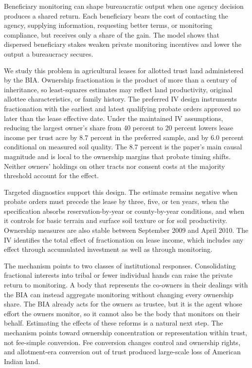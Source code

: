 \documentclass[12pt]{article}
\begin{document}
Beneficiary monitoring can shape bureaucratic output when one agency decision produces a shared return. Each beneficiary bears the cost of contacting the agency, supplying information, requesting better terms, or monitoring compliance, but receives only a share of the gain. The model shows that dispersed beneficiary stakes weaken private monitoring incentives and lower the output a bureaucracy secures.

We study this problem in agricultural leases for allotted trust land administered by the BIA. Ownership fractionation is the product of more than a century of inheritance, so least-squares estimates may reflect land productivity, original allottee characteristics, or family history. The preferred IV design instruments fractionation with the earliest and latest qualifying probate orders approved no later than the lease effective date. Under the maintained IV assumptions, reducing the largest owner's share from 40 percent to 20 percent lowers lease income per trust acre by 8.7 percent in the preferred sample, and by 6.0 percent conditional on measured soil quality. The 8.7 percent is the paper's main causal magnitude and is local to the ownership margins that probate timing shifts. Neither owners' holdings on other tracts nor consent costs at the majority threshold account for the effect.

Targeted diagnostics support this design. The estimate remains negative when probate orders must precede the lease by three, five, or ten years, when the specification absorbs reservation-by-year or county-by-year conditions, and when it controls for basic terrain and surface soil texture or for soil productivity. Ownership measures are also stable between September 2009 and April 2010. The IV identifies the total effect of fractionation on lease income, which includes any effect through accumulated investment as well as through monitoring.

The mechanism points to two classes of institutional responses. Consolidating fractional interests into tribal or fewer individual hands can raise the private return to monitoring. A body that represents the co-owners in their dealings with the BIA can instead aggregate monitoring without changing every ownership share. The BIA already acts for the owners as trustee, but it is the agent whose effort the owners monitor, so it cannot also be the body that monitors on their behalf. Estimating the effects of these reforms is a natural next step. The mechanism points toward ownership concentration or representation within trust, not fee-simple conversion. Fee conversion changes control and ownership rights, and allotment-era conversion out of trust produced large-scale loss of American Indian land.
\end{document}

